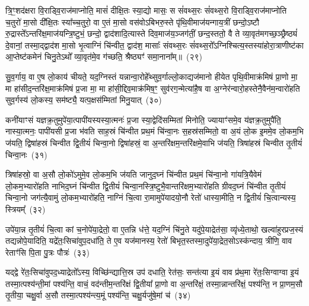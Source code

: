 त्रि॒ꣳ॒शद॑क्षरा वि॒राड्वि॒राज॑माप्नोति॒ मासं॑ दीक्षि॒तः स्या॒द्यो मासः॒ स सं॑वथ्स॒रः सं॑वथ्स॒रो वि॒राड्वि॒राज॑माप्नोति च॒तुरो॑ मा॒सो दी᳚क्षि॒तः स्या᳚च्च॒तुरो॒ वा ए॒तं मा॒सो वस॑वो\-ऽबिभरु॒स्ते पृ॑थि॒वीमाज॑यन्गाय॒त्रीं छन्दो॒\-ऽष्टौ रु॒द्रास्ते᳚\-ऽन्तरि॑क्ष॒माज॑यन्त्रि॒ष्टुभं॒ छन्दो॒ द्वाद॑शादि॒त्यास्ते दिव॒माज॑य॒ञ्जग॑तीं॒ छन्द॒स्ततो॒ वै ते व्या॒वृत॑मगच्छ॒ञ्छ्रैष्ठ्यं॑ दे॒वानां॒ तस्मा॒द्द्वाद॑श मा॒सो भृ॒त्वाग्निं चि॑न्वीत॒ द्वाद॑श॒ मासाः᳚ संवथ्स॒रः सं॑वथ्स॒रो᳚\-ऽग्निश्चित्य॒स्तस्या॑होरा॒त्राणीष्ट॑का आ॒प्तेष्ट॑कमेनं चिनु॒ते\-ऽथो᳚ व्या॒वृत॑मे॒व ग॑च्छति॒ श्रैष्ठ्यꣳ॑ समा॒नाना᳚म्॥~(२९)

{\anuvakamend[{स्या॒त् त्रयो॑दश त्रि॒ꣳ॒शत॒ꣳ॒ रात्री᳚र्दीक्षि॒तः स्या॒द्वै ते᳚\-ऽष्टाविꣳ॑शतिश्च}]}%

सु॒व॒र्गाय॒ वा ए॒ष लो॒काय॑ चीयते॒ यद॒ग्निस्तं यन्नान्वा॒रोहे᳚थ्सुव॒र्गाल्लो॒काद्यज॑मानो हीयेत पृथि॒वीमाक्र॑मिषं प्रा॒णो मा॒ मा हा॑सीद॒न्तरि॑क्ष॒माक्र॑मिषं प्र॒जा मा॒ मा हा॑सी॒द्दिव॒माक्र॑मिष॒ꣳ॒ सुव॑रग॒न्मेत्या॑है॒ष वा अ॒ग्नेर॑न्वारो॒हस्तेनै॒वैन॑\-म॒न्वारो॑हति सुव॒र्गस्य॑ लो॒कस्य॒ सम॑ष्ट्यै॒ यत्प॒क्षस॑म्मितां मिनु॒यात्~(३०)

कनी॑याꣳसं यज्ञक्र॒तुमुपे॑या॒त्पापी॑यस्यस्या॒त्मनः॑ प्र॒जा स्या॒द्वेदि॑सम्मितां मिनोति॒ ज्यायाꣳ॑समे॒व य॑ज्ञक्र॒तुमुपै॑ति॒ नास्या॒त्मनः॒ पापी॑यसी प्र॒जा भ॑वति साह॒स्रं चि॑न्वीत प्रथ॒मं चि॑न्वा॒नः स॒हस्र॑सम्मितो॒ वा अ॒यं लो॒क इ॒ममे॒व लो॒कम॒भि ज॑यति॒ द्विषा॑हस्रं चिन्वीत द्वि॒तीयं॑ चिन्वा॒नो द्विषा॑हस्रं॒ वा अ॒न्तरि॑क्षम॒न्तरि॑क्षमे॒वाभि ज॑यति॒ त्रिषा॑हस्रं चिन्वीत तृ॒तीयं॑ चिन्वा॒नः~(३१)

त्रिषा॑हस्रो॒ वा अ॒सौ लो॒को॑\-ऽमुमे॒व लो॒कम॒भि ज॑यति जानुद॒घ्नं चि॑न्वीत प्रथ॒मं चि॑न्वा॒नो गा॑यत्रि॒यैवेमं लो॒कम॒भ्यारो॑हति नाभिद॒घ्नं चि॑न्वीत द्वि॒तीयं॑ चिन्वा॒नस्त्रि॒ष्टुभै॒वान्तरि॑क्षम॒भ्यारो॑हति ग्रीवद॒घ्नं चि॑न्वीत तृ॒तीयं॑ चिन्वा॒नो जग॑त्यै॒वामुं लो॒कम॒भ्यारो॑हति॒ नाग्निं चि॒त्वा रा॒मामुपे॑यादयो॒नौ रेतो॑ धास्या॒मीति॒ न द्वि॒तीयं॑ चि॒त्वान्यस्य॒ स्त्रियम्᳚~(३२)

उपे॑या॒न्न तृ॒तीयं॑ चि॒त्वा कां च॒नोपे॑या॒द्रेतो॒ वा ए॒तन्नि ध॑त्ते॒ यद॒ग्निं चि॑नु॒ते यदु॑पे॒याद्रेत॑सा॒ व्यृ॑ध्ये॒ताथो॒ खल्वा॑हुरप्रज॒स्यं तद्यन्नोपे॒यादिति॒ यद्रे॑तः॒सिचा॑वुप॒दधा॑ति॒ ते ए॒व यज॑मानस्य॒ रेतो॑ बिभृत॒स्तस्मा॒दुपे॑या॒द्रेत॒सो\-ऽस्क॑न्दाय॒ त्रीणि॒ वाव रेताꣳ॑सि पि॒ता पु॒त्रः पौत्रः॑~(३३)

यद्द्वे रे॑तः॒सिचा॑वुपद॒ध्याद्रेतो᳚\-ऽस्य॒ विच्छि॑न्द्यात्ति॒स्र उप॑ दधाति॒ रेत॑सः॒ सन्त॑त्या इ॒यं वाव प्र॑थ॒मा रे॑तः॒सिग्वाग्वा इ॒यं तस्मा॒त्पश्य॑न्ती॒मां पश्य॑न्ति॒ वाचं॒ वद॑न्तीम॒न्तरि॑क्षं द्वि॒तीया᳚ प्रा॒णो वा अ॒न्तरि॑क्षं॒ तस्मा॒न्नान्तरि॑क्षं॒ पश्य॑न्ति॒ न प्रा॒णम॒सौ तृ॒तीया॒ चक्षु॒र्वा अ॒सौ तस्मा॒त्पश्य॑न्त्य॒मूं पश्य॑न्ति॒ चक्षु॒र्यजु॑षे॒मां च॑~(३४)

